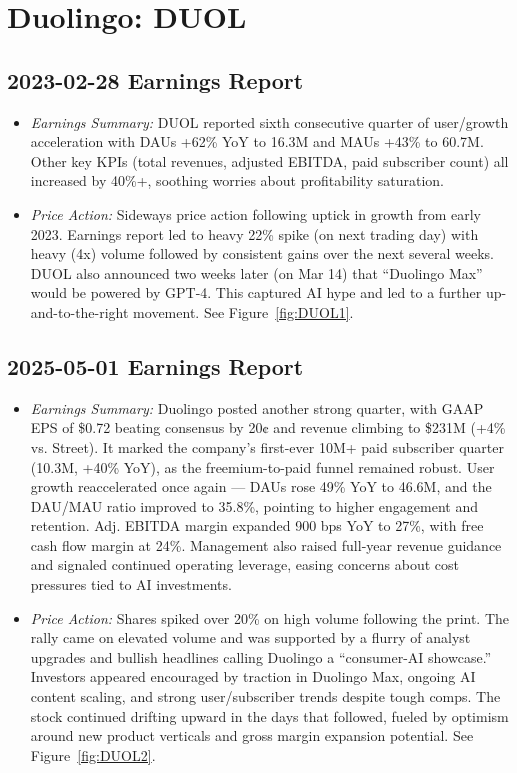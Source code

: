 \documentclass[11pt]{article}
\begin{document}
\section{Duolingo: DUOL}
    \subsection{2023-02-28 Earnings Report}
        \begin{itemize}
            \item \textit{Earnings Summary:} DUOL reported sixth consecutive quarter of user/growth acceleration with DAUs +62\% YoY to 16.3M and MAUs +43\% to 60.7M. Other key KPIs (total revenues, adjusted EBITDA, paid subscriber count) all increased by 40\%+, soothing worries about profitability saturation.
            \item \textit{Price Action:} Sideways price action following uptick in growth from early 2023. Earnings report led to heavy 22\% spike (on next trading day) with heavy (4x) volume followed by consistent gains over the next several weeks. DUOL also announced two weeks later (on Mar 14) that ``Duolingo Max'' would be powered by GPT-4. This captured AI hype and led to a further up-and-to-the-right movement. See Figure~\ref{fig:DUOL1}.
        \end{itemize}
    \subsection{2025-05-01 Earnings Report}
        \begin{itemize}
            \item \textit{Earnings Summary:} Duolingo posted another strong quarter, with GAAP EPS of \$0.72 beating consensus by 20¢ and revenue climbing to \$231M (+4\% vs. Street). It marked the company’s first-ever 10M+ paid subscriber quarter (10.3M, +40\% YoY), as the freemium-to-paid funnel remained robust. User growth reaccelerated once again — DAUs rose 49\% YoY to 46.6M, and the DAU/MAU ratio improved to 35.8\%, pointing to higher engagement and retention. Adj. EBITDA margin expanded 900 bps YoY to 27\%, with free cash flow margin at 24\%. Management also raised full-year revenue guidance and signaled continued operating leverage, easing concerns about cost pressures tied to AI investments.
            \item \textit{Price Action:} Shares spiked over 20\% on high volume following the print. The rally came on elevated volume and was supported by a flurry of analyst upgrades and bullish headlines calling Duolingo a “consumer-AI showcase.” Investors appeared encouraged by traction in Duolingo Max, ongoing AI content scaling, and strong user/subscriber trends despite tough comps. The stock continued drifting upward in the days that followed, fueled by optimism around new product verticals and gross margin expansion potential. See Figure~\ref{fig:DUOL2}.
        \end{itemize}
\end{document}
